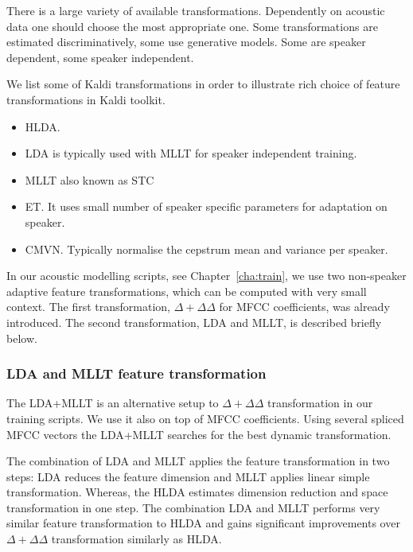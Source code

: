 There is a large variety of available transformations. 
Dependently on acoustic data one should choose the most appropriate one.
Some transformations are estimated discriminatively, some use generative models.
Some are speaker dependent, some speaker independent.

We list some of Kaldi transformations in order to illustrate rich choice of feature transformations in Kaldi toolkit.
\begin{itemize}
    \item \acf{HLDA}\cite{gales1999semi}.
    \item \acf{LDA}\cite{gopinath1998maximum} is typically used with \acs{MLLT} for speaker independent training.
    \item \acf{MLLT} also known as \acf{STC}\cite{gopinath1998maximum}
    \item \acf{ET}\cite{povey2011exponential}. It uses small number of speaker specific parameters for adaptation on speaker.
    \item \acf{CMVN}\cite{molau2003feature}. Typically normalise the cepstrum mean and variance per speaker.
\end{itemize}

In our acoustic modelling scripts, see Chapter~\ref{cha:train},  we use two non-speaker adaptive feature transformations, which can be computed with very small context. 
The first transformation, $\Delta+\Delta\Delta$  for \ac{MFCC} coefficients, was already introduced.
The second transformation, \ac{LDA} and \ac{MLLT}, is described briefly below.

\subsubsection*{\acl{LDA} and \ac{MLLT} feature transformation}
The \ac{LDA}+\ac{MLLT} is an alternative setup to $\Delta+\Delta\Delta$ transformation in our training scripts.
We use it also on top of \ac{MFCC} coefficients.
Using several spliced \ac{MFCC} vectors the \ac{LDA}+\ac{MLLT} searches for the best dynamic transformation.

The combination of \ac{LDA} and \ac{MLLT} applies the feature transformation in two steps: \ac{LDA} reduces the feature dimension and \ac{MLLT} applies linear simple transformation\cite{gopinath1998maximum}.
Whereas, the \ac{HLDA} estimates dimension reduction and space transformation in one step.\cite{gales1999semi}
The combination \ac{LDA} and \ac{MLLT} performs very similar feature transformation to \ac{HLDA} and gains significant improvements over $\Delta+\Delta\Delta$ transformation similarly as \ac{HLDA}\cite{gales1999semi}\cite{gopinath1998maximum}.

